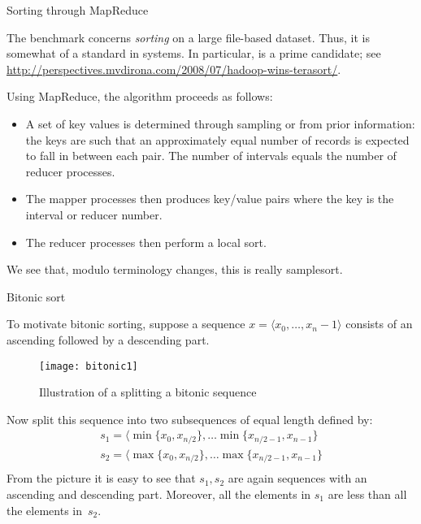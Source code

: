 
 {Sorting through MapReduce}
\label{sec:terasort}

The  benchmark concerns
%
\emph{sorting} on a large
file-based dataset. Thus, it is somewhat of a standard in
 systems. In particular, 
 is a prime candidate; see
\url{http://perspectives.mvdirona.com/2008/07/hadoop-wins-terasort/}.

Using MapReduce, the algorithm proceeds as follows:
\begin{itemize}
\item A set of key values is determined through sampling or from prior
  information: the keys are such that an approximately equal number of
  records is expected to fall in between each pair. The number of
  intervals equals the number of reducer processes.
\item The mapper processes then produces key/value pairs where the key
  is the interval or reducer number.
\item The reducer processes then perform a local sort.
\end{itemize}

We see that, modulo terminology changes, this is really samplesort.


 {Bitonic sort}
\label{app:bitonicsort}

To motivate bitonic sorting,
suppose a sequence $x=\langle x_0,\ldots,x_n-1\rangle$
consists of an ascending
followed by a descending part.
\begin{figure}[h]
\texttt{[image: bitonic1]}
\caption{Illustration of a splitting a bitonic sequence}
\end{figure}
Now split this sequence into two subsequences of equal length
defined by:
\begin{equation}
\begin{array}{cc}
s_1 = \langle \min\{x_0,x_{n/2}\},\ldots \min\{ x_{n/2-1},x_{n-1}\}\\
s_2 = \langle \max\{x_0,x_{n/2}\},\ldots \max\{ x_{n/2-1},x_{n-1}\}\\
\end{array}
\label{eq:bitonic-split}
\end{equation}
From the picture it is easy to see that $s_1,s_2$ are again 
sequences with an ascending and descending part. Moreover,
all the elements in $s_1$ are less than all the elements in~$s_2$.

